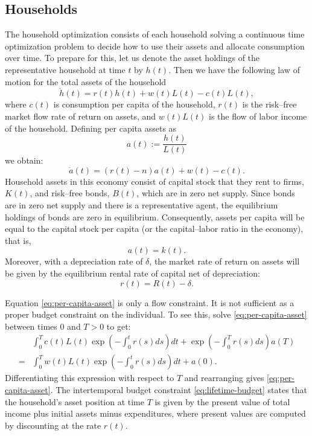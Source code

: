 \documentclass[\topdir/lecture\_notes.tex]{subfiles}
\begin{document}
\subsection{Households}
The household optimization consists of each household solving a continuous time optimization problem to decide how to use their assets and allocate consumption over time.
To prepare for this, let us denote the asset holdings of the representative household at time $t$ by $h(t)$.
Then we have the following law of motion for the total assets of the household
\begin{equation*}
  \dot{h}(t)=r(t) h(t)+w(t) L(t)-c(t) L(t),
\end{equation*}
where $c(t)$ is consumption per capita of the household, $r(t)$ is the risk--free market flow rate of return on assets, and $w(t) L(t)$ is the flow of labor income of the household.
Defining per capita assets as
\[
  a(t) := \frac{h(t)}{L(t)}
\]
we obtain:
\begin{equation}
  \dot{a}(t)=(r(t)-n) a(t)+w(t)-c(t).
  \label{eq:per-capita-asset}
\end{equation}
Household assets in this economy consist of capital stock that they rent to firms, $K(t)$, and risk--free bonds, $B(t)$, which are in zero net supply.
Since bonds are in zero net supply and there is a representative agent, the equilibrium holdings of bonds are zero in equilibrium.
Consequently, assets per capita will be equal to the capital stock per capita (or the capital--labor ratio in the economy), that is,
\[
  a(t)=k(t).
\]
Moreover, with a depreciation rate of $\delta$, the market rate of return on assets will be given by the equilibrium rental rate of capital net of depreciation:
\begin{equation}
  r(t)=R(t)-\delta.
  \label{eq:return-on-assets}
\end{equation}

Equation \eqref{eq:per-capita-asset} is only a flow constraint.
It is not sufficient as a proper budget constraint on the individual.
To see this, solve \eqref{eq:per-capita-asset} between times 0 and $T>0$ to get:
\begin{equation}
  \begin{aligned}
      & \int_{0}^{T} c(t) L(t) \exp \left(-\int_{0}^{t} r(s) ds\right) dt+\exp \left(-\int_{0}^{T} r(s) ds\right) a(T) \\
    = & \int_{0}^{T} w(t) L(t) \exp \left(-\int_{0}^{t} r(s) ds\right) dt+a(0).
  \end{aligned}
  \label{eq:lifetime-budget}
\end{equation}
Differentiating this expression with respect to $T$ and rearranging gives \eqref{eq:per-capita-asset}.
The intertemporal budget constraint \eqref{eq:lifetime-budget} states that the household's asset position at time $T$ is given by the present value of total income plus initial assets minus expenditures, where present values are computed by discounting at the rate $r(t)$.
\end{document}
